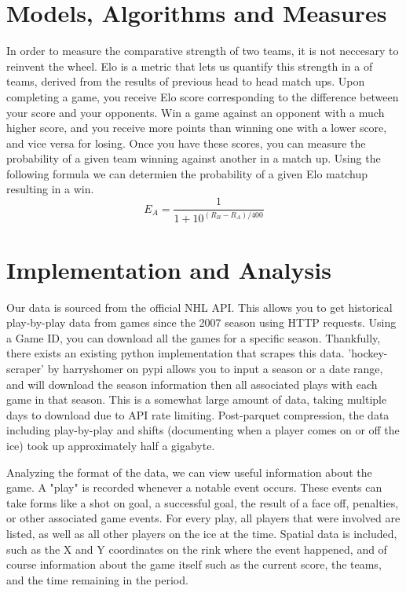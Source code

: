 \documentclass{article}
\begin{document}
\section{Models, Algorithms and Measures}

In order to measure the comparative strength of two teams, it is not neccesary to reinvent the wheel. 
Elo is a metric that lets us quantify this strength in a of teams, derived from the results of previous head to head match ups.
Upon completing a game, you receive Elo score corresponding to the difference between your score and your opponents. Win a game against
an opponent with a much higher score, and you receive more points than winning one with a lower score, and vice versa for losing.
Once you have these scores, you can measure the probability of a given team winning against another in a match up. 
Using the following formula we can determien the probability of a given Elo matchup resulting in a win.
\[E_{A} = \frac{1}{1 + 10^{(R_{B} - R_{A})/400}}\] 


\section{Implementation and Analysis}
Our data is sourced from the official NHL API. This allows you to get historical play-by-play 
data from games since the 2007 season using HTTP requests. Using a Game ID, you can download 
all the games for a specific season. Thankfully, there exists an existing python implementation 
that scrapes this data. 'hockey-scraper' by harryshomer on pypi allows you to input a season
or a date range, and will download the season information then all associated plays with
each game in that season. This is a somewhat large amount of data, taking multiple days to 
download due to API rate limiting. Post-parquet compression, the data including play-by-play
and shifts (documenting when a player comes on or off the ice) took up approximately half a gigabyte.

Analyzing the format of the data, we can view useful information about the game. A "play" is 
recorded whenever a notable event occurs. These events can take forms like a shot on goal, 
a successful goal, the result of a face off, penalties, or other associated game events. 
For every play, all players that were involved are listed, as well as all other players on 
the ice at the time. Spatial data is included, such as the X and Y coordinates on the rink 
where the event happened, and of course information about the game itself such as the current 
score, the teams, and the time remaining in the period.
\end{document}
